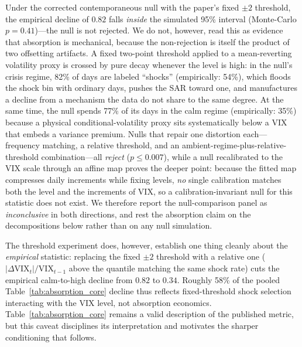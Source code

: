 \documentclass[12pt,a4paper]{article}
\begin{document}
Under the corrected contemporaneous null with the paper's fixed $\pm 2$ threshold, the empirical decline of $0.82$ falls \textit{inside} the simulated 95\% interval (Monte-Carlo $p = 0.41$)---the null is not rejected. We do not, however, read this as evidence that absorption is mechanical, because the non-rejection is itself the product of two offsetting artifacts. A fixed two-point threshold applied to a mean-reverting volatility proxy is crossed by pure decay whenever the level is high: in the null's crisis regime, 82\% of days are labeled ``shocks'' (empirically: 54\%), which floods the shock bin with ordinary days, pushes the SAR toward one, and manufactures a decline from a mechanism the data do not share to the same degree. At the same time, the null spends 77\% of its days in the calm regime (empirically: 35\%) because a physical conditional-volatility proxy sits systematically below a VIX that embeds a variance premium.
Nulls that repair one distortion each---frequency matching, a relative threshold, and an ambient-regime-plus-relative-threshold combination---all \textit{reject} ($p \leq 0.007$), while a null recalibrated to the VIX scale through an affine map proves the deeper point: because the fitted map compresses daily increments while fixing levels, \textit{no} single calibration matches both the level and the increments of VIX, so a calibration-invariant null for this statistic does not exist.
We therefore report the null-comparison panel as \textit{inconclusive} in both directions, and rest the absorption claim on the decompositions below rather than on any null simulation.

The threshold experiment does, however, establish one thing cleanly about the \textit{empirical} statistic: replacing the fixed $\pm 2$ threshold with a relative one ($|\Delta\text{VIX}_t| / \text{VIX}_{t-1}$ above the quantile matching the same shock rate) cuts the empirical calm-to-high decline from $0.82$ to $0.34$.
Roughly 58\% of the pooled Table~\ref{tab:absorption_core} decline thus reflects fixed-threshold shock selection interacting with the VIX level, not absorption economics. Table~\ref{tab:absorption_core} remains a valid description of the published metric, but this caveat disciplines its interpretation and motivates the sharper conditioning that follows.
\end{document}
